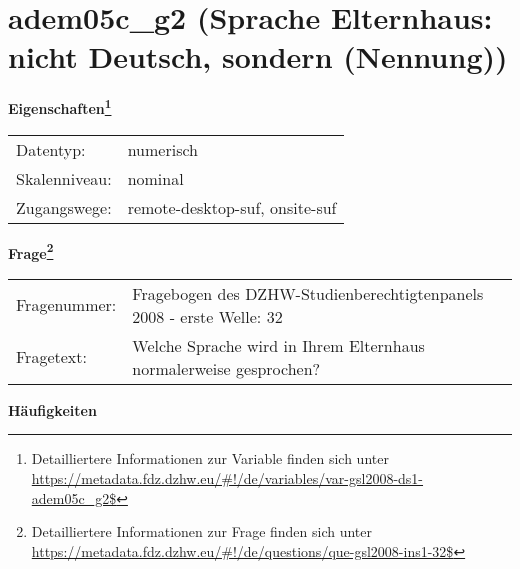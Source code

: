 
    \setcounter{footnote}{0}

    \vspace*{-1.8cm}
	\section{adem05c\_g2 (Sprache Elternhaus: nicht Deutsch, sondern (Nennung))}
	\label{section:adem05c_g2}



    \vspace*{0.5cm}
    \noindent\textbf{Eigenschaften\footnote{Detailliertere Informationen zur Variable finden sich unter
		\url{https://metadata.fdz.dzhw.eu/\#!/de/variables/var-gsl2008-ds1-adem05c_g2$}}}\\
	\begin{tabularx}{\hsize}{@{}lX}
	Datentyp: & numerisch \\
	Skalenniveau: & nominal \\
	Zugangswege: &
	  remote-desktop-suf, 
	  onsite-suf
 \\
    \end{tabularx}



				\vspace*{0.5cm}
                \noindent\textbf{Frage\footnote{Detailliertere Informationen zur Frage finden sich unter
		              \url{https://metadata.fdz.dzhw.eu/\#!/de/questions/que-gsl2008-ins1-32$}}}\\
				\begin{tabularx}{\hsize}{@{}lX}
					Fragenummer: &
					  Fragebogen des DZHW-Studienberechtigtenpanels 2008 - erste Welle:
					  32
 \\
					Fragetext: & Welche Sprache wird in Ihrem Elternhaus normalerweise gesprochen? \\
				\end{tabularx}





        		\vspace*{0.5cm}
                \noindent\textbf{Häufigkeiten}

